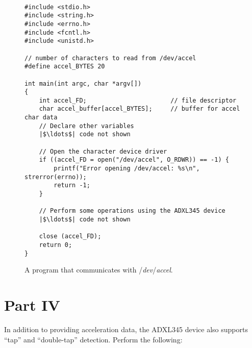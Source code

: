 \documentclass[epsfig,10pt,fullpage]{article}
\begin{document}
~\\
\lstset{language=C,numbers=none,escapechar=|}
\begin{figure}[h]
\begin{center}
\begin{minipage}[t]{13.5 cm}
\begin{lstlisting}[name=part1]
#include <stdio.h>
#include <string.h>
#include <errno.h>
#include <fcntl.h>
#include <unistd.h>

// number of characters to read from /dev/accel
#define accel_BYTES 20

int main(int argc, char *argv[])
{
	int accel_FD;						// file descriptor
	char accel_buffer[accel_BYTES];		// buffer for accel char data
	// Declare other variables
	|$\ldots$| code not shown 
    
	// Open the character device driver
  	if ((accel_FD = open("/dev/accel", O_RDWR)) == -1) {
		printf("Error opening /dev/accel: %s\n", strerror(errno));
		return -1;
	}
	
	// Perform some operations using the ADXL345 device
	|$\ldots$| code not shown

	close (accel_FD);
	return 0;
}
\end{lstlisting}
\end{minipage}
\caption{A program that communicates with /{\it dev}/{\it accel}.}
\label{fig:part2}
\end{center}
\end{figure}
\newpage
\noindent
\section*{Part IV}

\noindent
In addition to providing acceleration data, the ADXL345 device also supports ``tap'' and
``double-tap'' detection. Perform the following:
\end{document}
